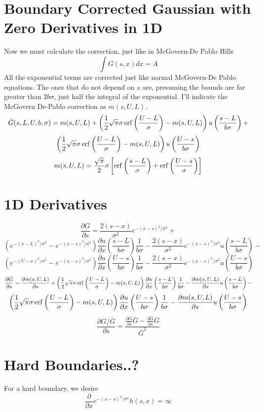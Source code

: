 \documentclass{article}
\newcommand{\erf}{\mathop{\rm erf}\nolimits}
\begin{document}
\section{Boundary Corrected Gaussian with Zero Derivatives in 1D}
Now we must calculate the correction, just like in McGovern-De Pablo
Hills
\[
\int G(s,x) dx = A
\]
All the exponential terms are corrected just like normal McGovern-De
Pablo equations. The ones that do not depend on $s$ are, presuming the
bounds are far greater than $2b\sigma$, just half the integral of the
exponential. I'll indicate the McGovern De-Pablo correction as
$m(s,U,L)$.
\[
\bar{G}(s,L,U,b,\sigma) = m(s,U,L) + \left(\frac{1}{2}\sqrt{\pi}\sigma \erf\left(\frac{U - L}{\sigma}\right) - m(s,U,L)\right)u\left(\frac{s-L}{b\sigma}\right) + 
\]
\begin{equation}
\left(\frac{1}{2}\sqrt{\pi}\sigma\erf\left(\frac{U - L}{\sigma}\right) - m(s,U,L)\right)u\left(\frac{U-s}{b\sigma}\right)
\end{equation}
\begin{equation}
m(s,U,L) = \frac{\sqrt{\pi}}{2} \sigma \left[\erf\left(\frac{s - L}{\sigma}\right) + \erf\left(\frac{U - s}{\sigma}\right)\right]
\end{equation}

\section{1D Derivatives}
\[
\frac{\partial G}{\partial s} = \frac{2(s - x)}{\sigma^2} e^{-(x - s)^2 / \sigma^2} + 
\]
\[
\left(e^{-(x-L)^2/\sigma^2} - e^{-(x - s)^2 / \sigma^2}\right)\frac{\partial u}{\partial x}\left(\frac{s-L}{b\sigma}\right)\frac{1}{b\sigma} - \frac{2(s - x)}{\sigma^2} e^{-(x - s)^2 / \sigma^2} u\left(\frac{s-L}{b\sigma}\right) -
\]
\[
\left(e^{-(U-x)^2/\sigma^2} - e^{-(x - s)^2 / \sigma^2}\right)\frac{\partial u}{\partial x}\left(\frac{U-s}{b\sigma}\right)\frac{1}{b\sigma} - \frac{2(s - x)}{\sigma^2} e^{-(x - s)^2 / \sigma^2} u\left(\frac{U-s}{b\sigma}\right)
\]
\[
\frac{\partial \bar{G}}{\partial s} = \frac{\partial m(s, U, L)}{\partial s} + \left(\frac{1}{2}\sqrt{\pi}\sigma \erf\left(\frac{U - L}{\sigma}\right) - m(s,U,L)\right)\frac{\partial u}{\partial x}\left(\frac{s-L}{b\sigma}\right)\frac{1}{b\sigma} - \frac{\partial m(s, U, L)}{\partial s}u\left(\frac{s-L}{b\sigma}\right) -
\]
\[
\left(\frac{1}{2}\sqrt{\pi}\sigma \erf\left(\frac{U - L}{\sigma}\right) - m(s,U,L)\right)\frac{\partial u}{\partial x}\left(\frac{U-s}{b\sigma}\right)\frac{1}{b\sigma} - \frac{\partial m(s, U, L)}{\partial s}u\left(\frac{U-s}{b\sigma}\right)
\]
\[
\frac{\partial G/\bar{G}}{\partial s} = \frac{\frac{\partial G}{\partial s}\bar{G} - \frac{\partial \bar{G}}{\partial s}G}{\bar{G}^2}
\]

\section{Hard Boundaries..?}
For a hard boundary, we desire 
\[
\frac{\partial}{\partial x} e^{-(x - s)^2 / \sigma^2} h(s,x) = \infty
\]
\end{document}
